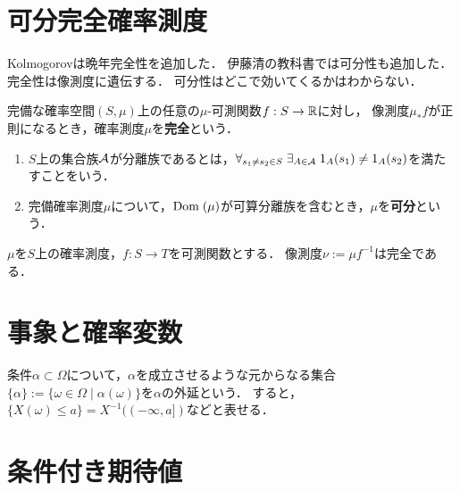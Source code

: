 \documentclass[uplatex,dvipdfmx]{jsreport}
\begin{document}
\section{可分完全確率測度}

\begin{tcolorbox}[colframe=ForestGreen, colback=ForestGreen!10!white,breakable,colbacktitle=ForestGreen!40!white,coltitle=black,fonttitle=\bfseries\sffamily,
title=]
    Kolmogorovは晩年完全性を追加した．
    伊藤清の教科書では可分性も追加した．
    完全性は像測度に遺伝する．
    可分性はどこで効いてくるかはわからない．
\end{tcolorbox}

\begin{definition}\label{def-perfect-measure}
    完備な確率空間$(S,\mu)$上の任意の$\mu$-可測関数$f:S\to\mathbb{R}$に対し，
    像測度$\mu_*f$が正則になるとき，確率測度$\mu$を\textbf{完全}という．
\end{definition}

\begin{definition}\mbox{}
    \begin{enumerate}
        \item $S$上の集合族$\mathcal{A}$が分離族であるとは，$\forall_{s_1\ne s_2\in S}\;\exists_{A\in\mathcal{A}}\;1_A(s_1)\ne 1_A(s_2)$を満たすことをいう．
        \item 完備確率測度$\mu$について，$\mathrm{Dom}\;(\mu)$が可算分離族を含むとき，$\mu$を\textbf{可分}という．
    \end{enumerate}
\end{definition}

\begin{theorem}
    $\mu$を$S$上の確率測度，$f:S\to T$を可測関数とする．
    像測度$\nu:=\mu f^{-1}$は完全である．
\end{theorem}

\section{事象と確率変数}

\begin{notation}[extension]
    条件$\alpha\subset\Omega$について，$\alpha$を成立させるような元からなる集合$\{\alpha\}:=\{\omega\in\Omega\mid \alpha(\omega)\}$を$\alpha$の外延という．
    すると，$\{X(\omega)\le a\}=X^{-1}((-\infty,a])$などと表せる．
\end{notation}

\section{条件付き期待値}
\end{document}
